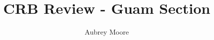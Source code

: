 \documentclass[preprint,12pt]{elsarticle}
\begin{document}
\begin{frontmatter}


\title{CRB Review - Guam Section}




\author{Aubrey Moore}

\address{University of Guam}


%
%

\end{frontmatter}
\end{document}
